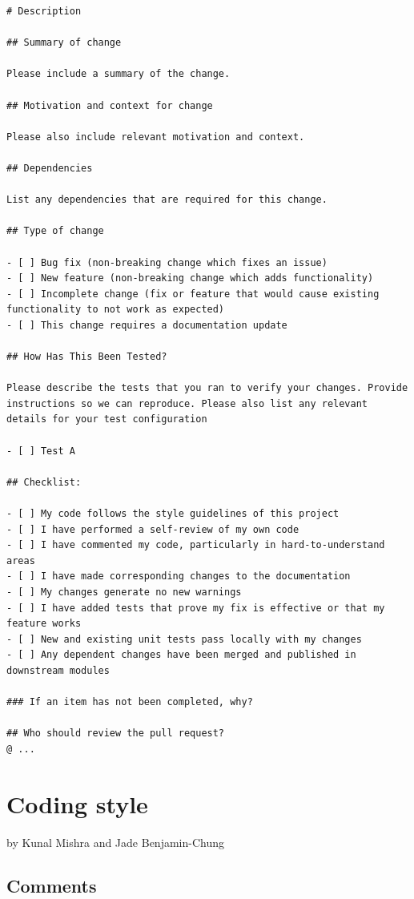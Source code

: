 \documentclass[]{book}
\begin{document}
\begin{verbatim}
# Description

## Summary of change

Please include a summary of the change. 

## Motivation and context for change

Please also include relevant motivation and context. 

## Dependencies 

List any dependencies that are required for this change.

## Type of change

- [ ] Bug fix (non-breaking change which fixes an issue)
- [ ] New feature (non-breaking change which adds functionality)
- [ ] Incomplete change (fix or feature that would cause existing functionality to not work as expected)
- [ ] This change requires a documentation update

## How Has This Been Tested?

Please describe the tests that you ran to verify your changes. Provide instructions so we can reproduce. Please also list any relevant details for your test configuration

- [ ] Test A

## Checklist:

- [ ] My code follows the style guidelines of this project
- [ ] I have performed a self-review of my own code
- [ ] I have commented my code, particularly in hard-to-understand areas
- [ ] I have made corresponding changes to the documentation
- [ ] My changes generate no new warnings
- [ ] I have added tests that prove my fix is effective or that my feature works
- [ ] New and existing unit tests pass locally with my changes
- [ ] Any dependent changes have been merged and published in downstream modules

### If an item has not been completed, why?

## Who should review the pull request?
@ ...
\end{verbatim}

\chapter{Coding style}\label{coding-style}

by Kunal Mishra and Jade Benjamin-Chung

\section{Comments}\label{comments}
\end{document}
